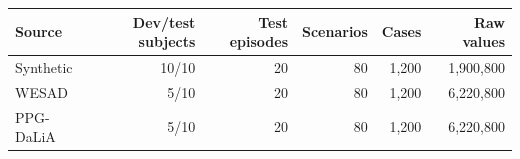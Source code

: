 \begin{tabular}{lrrrrr}
\toprule
Source & Dev/test subjects & Test episodes & Scenarios & Cases & Raw values \\
\midrule
Synthetic & 10/10 & 20 & 80 & 1,200 & 1,900,800 \\
WESAD & 5/10 & 20 & 80 & 1,200 & 6,220,800 \\
PPG-DaLiA & 5/10 & 20 & 80 & 1,200 & 6,220,800 \\
\bottomrule
\end{tabular}
